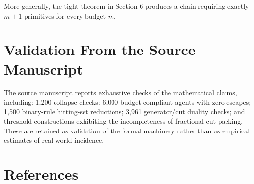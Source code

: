 \documentclass[11pt]{article}
\begin{document}
More generally, the tight theorem in Section 6 produces a chain requiring exactly $m+1$ primitives for every budget $m$.

\section{Validation From the Source Manuscript}

The source manuscript reports exhaustive checks of the mathematical claims, including: 1,200 collapse checks; 6,000 budget-compliant agents with zero escapes; 1,500 binary-rule hitting-set reductions; 3,961 generator/cut duality checks; and threshold constructions exhibiting the incompleteness of fractional cut packing. These are retained as validation of the formal machinery rather than as empirical estimates of real-world incidence.

\section{References}
\end{document}
